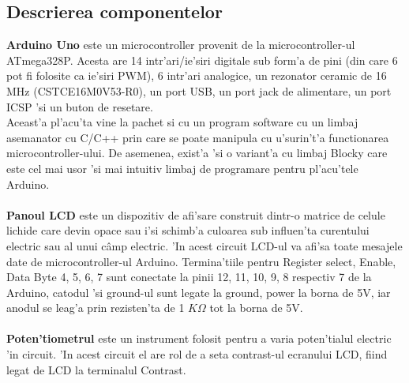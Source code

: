 \vspace{10mm}
\subsection{Descrierea componentelor}
\myindent
\textbf {Arduino Uno} este un microcontroller provenit de la microcontroller-ul ATmega328P. Acesta are 14 intr'ari/ie'siri digitale sub form'a de pini (din care 6 pot fi folosite ca ie'siri PWM), 6 intr'ari analogice, un rezonator ceramic de 16 MHz (CSTCE16M0V53-R0), un port USB, un port jack de alimentare, un port ICSP 'si un buton de resetare.\\

\myindent
Aceast'a pl'acu'ta vine la pachet si cu un program software cu un limbaj asemanator cu C/C++ prin care se poate manipula cu u'surin't'a functionarea microcontroller-ului. De asemenea, exist'a 'si o variant'a cu limbaj Blocky care este cel mai usor 'si mai intuitiv limbaj de programare pentru pl'acu'tele Arduino.\\\\

\myindent
\textbf {Panoul LCD} este un dispozitiv de afi'sare construit dintr-o matrice de celule lichide care devin opace sau i'si schimb'a culoarea sub influen'ta curentului electric sau al unui c\^amp electric. 'In acest circuit LCD-ul va afi'sa toate mesajele date de microcontroller-ul Arduino. Termina'tiile pentru Register select, Enable, Data Byte 4, 5, 6, 7 sunt conectate la pinii 12, 11, 10, 9, 8 respectiv 7 de la Arduino, catodul 'si ground-ul sunt legate la ground, power la borna de 5V, iar anodul se leag'a prin rezisten'ta de 1 $K\Omega$ tot la borna de 5V. \\\\

\myindent
\textbf {Poten'tiometrul} este un instrument folosit pentru a varia poten'tialul electric 'in circuit. 'In acest circuit el are rol de a seta contrast-ul ecranului LCD, fiind legat de LCD la terminalul Contrast.\\

\vspace{5mm}
